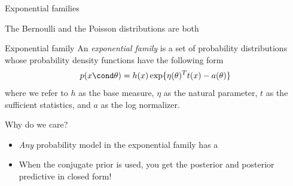 \documentclass[10pt]{beamer}
\begin{document}
\begin{frame}{Exponential families}

The Bernoulli and the Poisson distributions are both 
 
\begin{block}{Exponential family}
An \textit{exponential family} is a set of probability distributions whose probability density functions have the following form
\begin{align*}
\label{eqn:exponential_family}
 p(x \cond \theta) = h(x) \exp \{ \eta(\theta)^T t(x) - a(\theta)\} 
\end{align*}
where we refer to $h$ as the base measure, $\eta$ as the natural parameter, $t$ as the sufficient statistics, and $a$ as the log normalizer. 
\end{block}

\pause 
\begin{sblock}{Why do we care?}
 \pause 
\begin{itemize}
\item \textit{Any} probability model in the exponential family has a  \pause 
\item When the conjugate prior is used, you get the posterior and posterior predictive in \alert{closed form}! 
\end{itemize}
\end{sblock}

\end{frame}






\end{document}
